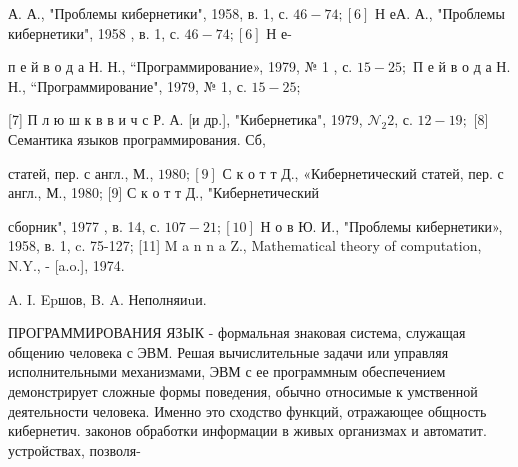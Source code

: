 \documentclass[10pt]{article}
\begin{document}
А. А., "Проблемы кибернетики", 1958, в. 1, с. $46-74 ;[6]$ Н еА. А., "Проблемы кибернетики", 1958 , в. 1, с. $46-74 ;[6]$ Н е-

п е й в о д а Н. Н., “Программирование», 1979, № 1 , с. $15-25 ;$ П е й в о д а Н. Н., “Программирование", 1979, № 1, с. $15-25$;

[7] П л ю ш к в в и ч с Р. А. [и др.], "Кибернетика", 1979, $\mathcal{N}_{2} 2$, с. $12-19 ;$ [8] Семантика языков программирования. Сб,

статей, пер. с англ., М., $1980 ;[9]$ С к о т т Д., «Кибернетический статей, пер. с англ., М., 1980; [9] С к о т т Д., "Кибернетический

сборник", 1977 , в. 14, с. $107-21 ;[10]$ Н о в Ю. И., "Проблемы кибернетики», 1958, в. 1, c. 75-127; [11] M a n n a Z., Mathematical theory of computation, N.Y., - [a.o.], 1974.

A. I. Epшов, B. A. Неполняиuи.



ПРОГРАММИРОВАНИЯ ЯЗЫК - формальная знаковая система, служащая общению человека с ЭВМ. Решая вычислительные задачи или управляя исполнительными механизмами, ЭВМ с ее программным обеспечением демонстрирует сложные формы поведения, обычно относимые к умственной деятельности человека. Именно это сходство функций, отражающее общность кибернетич. законов обработки информации в живых организмах и автоматит. устройствах, позволя-
\end{document}
